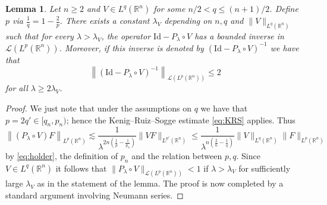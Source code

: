 \documentclass[11pt,a4paper]{amsart}
\newtheorem{lemma}[proposition]{Lemma}
\theoremstyle{remark}
\theoremstyle{definition}
\newcommand{\R}{\mathbb{R}}
\newcommand{\Id}{\mathrm{Id}}
\begin{document}
\begin{lemma}\label{lem:I-P inverse in Lp}\sl Let $n\geq 2$ and $V \in L^q(\R^n) $ for some $n/2< q \leq (n+1)/2$. Define $p$ via $\frac{1}{q} = 1 - \frac{2}{p} $. There exists a constant $\lambda_V$ depending on $n,q$ and $\|V\|_{L^q(\R^n)}$ such that for every $ \lambda > \lambda_V $, the operator $ \Id - P_\lambda \circ V $ has a bounded inverse in $\mathcal{L}(L^p(\R^n))$. Moreover, if this inverse is denoted by $ ( \Id - P_\lambda \circ V )^{ -1 }$ we have that
\[
 \left\| ( \Id - P_\lambda \circ V )^{-1} \right\|_{\mathcal{L}(L^p(\R^n))} \leq  2 
\]
for all $\lambda \geq 2\lambda_V $.
\end{lemma}

\begin{proof} We just note that under the assumptions on $q$ we have that $p=2q' \in[q_n,p_n)$;
hence the Kenig--Ruiz--Sogge estimate \eqref{eq:KRS} applies. Thus
\[
\left \|(P_\lambda \circ V )F\right\|_{L^p(\R^n)}\lesssim \frac{1}{\lambda^{2n\left(\frac1p-\frac{1}{p_n}\right)}} \|VF\|_{L^{p'}(\R^n)}\leq \frac{1}{\lambda^{n\left(\frac2n-\frac{1}{q}\right)}}\|V\|_{L^q(\R^n)}\|F\|_{L^p(\R^n)}
\]
by \eqref{eq:holder}, the definition of $p_n$ and the relation between $p,q$. Since $V\in  L^q(\R^n)$ it follows that $\|P_\lambda \circ V\|_{\mathcal L(L^p(\R^n))}<1$ if $\lambda>\lambda_V$ for sufficiently large $\lambda_V$ as in the statement of the lemma. The proof is now completed by a standard argument involving Neumann series.
\end{proof}
\end{document}
